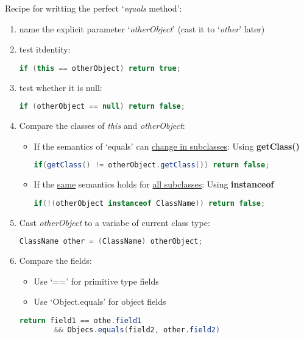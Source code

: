 \documentclass[12pt]{article}
\begin{document}
Recipe for writting the perfect `\emph{equals} method':
\begin{enumerate}
    \item name the explicit parameter `\emph{otherObject}' (cast it to `\emph{other}' later)
    \item test itdentity:
    \begin{lstlisting}[language=Java]
    if (this == otherObject) return true;
    \end{lstlisting}
    \item test whether it is null:
    \begin{lstlisting}[language=Java]
    if (otherObject == null) return false;
    \end{lstlisting}
    \item Compare the classes of \emph{this} and \emph{otherObject}:
    \begin{itemize}
        \item If the semantics of `equals' can \underline{change in subclasses}: Using \textbf{getClass()}
    \begin{lstlisting}[language=Java]
    if(getClass() != otherObject.getClass()) return false;
    \end{lstlisting}
        \item If the \underline{same} semantics holds for \underline{all subclasses}: Using \textbf{instanceof}
    \begin{lstlisting}[language=Java]
    if(!(otherObject instanceof ClassName)) return false;
    \end{lstlisting}
    \end{itemize}
    \item Cast \emph{otherObject} to a variabe of current class type:
    \begin{lstlisting}[language=Java]
    ClassName other = (ClassName) otherObject;
    \end{lstlisting}
    \item Compare the fields:
    \begin{itemize}
        \item Use `==' for primitive type fields
        \item Use `Object.equals' for object fields
    \end{itemize}
    \begin{lstlisting}[language=Java]
    return field1 == othe.field1
        && Objecs.equals(field2, other.field2)
    \end{lstlisting}
\end{enumerate}
\end{document}
